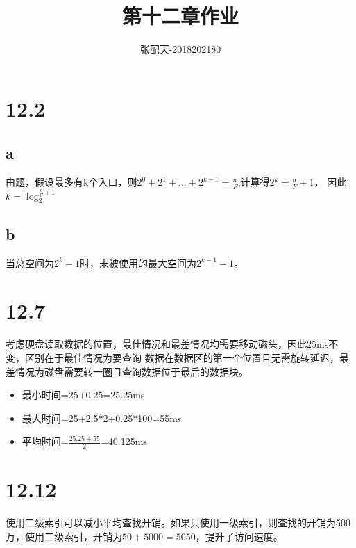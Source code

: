 \documentclass[UTF8]{ctexart}
\title{第十二章作业}
\author{张配天-2018202180}
\begin{document}
    \maketitle
    \section*{12.2}
    \subsection*{a}
    由题，假设最多有k个入口，则$2^0+2^1+ \dots +2^{k-1} = \frac{n}{F}$,计算得$2^k = \frac{n}{F}+1$，
    因此$k = \log_{2}^{\frac{n}{F}+1}$
    \subsection*{b}
    当总空间为$2^k - 1$时，未被使用的最大空间为$2^{k-1}-1$。
    \section*{12.7}
    考虑硬盘读取数据的位置，最佳情况和最差情况均需要移动磁头，因此25ms不变，区别在于最佳情况为要查询
    数据在数据区的第一个位置且无需旋转延迟，最差情况为磁盘需要转一圈且查询数据位于最后的数据块。
    \begin{itemize}
        \item 最小时间=25+0.25=25.25ms
        \item 最大时间=25+2.5*2+0.25*100=55ms
        \item 平均时间=$\frac{25.25+55}{2}$=40.125ms
    \end{itemize}
    \section*{12.12}
    使用二级索引可以减小平均查找开销。如果只使用一级索引，则查找的开销为500万，使用二级索引，开销为$50+5000 = 5050$，提升了访问速度。
    
\end{document}
